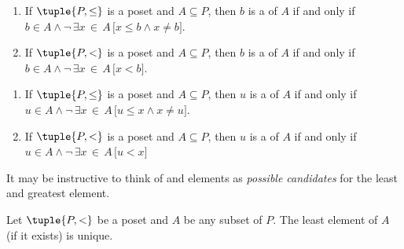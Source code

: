 \begin{dfn}
    \label{dfn:minimal-element}
    \hfill
    \begin{enumerate}[topsep=2pt,label=\texttt{\textup{(\alph*)}},itemsep=5pt]
        \item If \( \tuple{P, \leq} \) is a poset and \( A \subseteq P \), then \( b \) is a  of \( A \)
              if and only if \( b \in A \land \lnot \, \exists x\,{\in}\,A \, \big[ x \leq b \land x \neq b \big] \).
        \item If \( \tuple{P, <} \) is a poset and \( A \subseteq P \), then \( b \) is a  of \( A \)
              if and only if \( b \in A \land \lnot \, \exists x\,{\in}\,A \, \big[ x < b \big] \).
    \end{enumerate}
\end{dfn}

\begin{dfn}
    \label{dfn:maximal-element}
    \hfill
    \begin{enumerate}[topsep=2pt,label=\texttt{\textup{(\alph*)}},itemsep=5pt]
        \item If \( \tuple{P, \leq} \) is a poset and \( A \subseteq P \), then \( u \) is a  of \( A \)
              if and only if \( u \in A \land \lnot \, \exists x\,{\in}\,A \, \big[ u \leq x \land x \neq u \big]\).
        \item If \( \tuple{P, <} \) is a poset and \( A \subseteq P \), then \( u \) is a  of \( A \)
              if and only if \( u \in A \land \lnot \, \exists x\,{\in}\,A \, \big[ u < x \big] \)
    \end{enumerate}
\end{dfn}

\begin{rem}
    It may be instructive to think of  and  elements as \emph{possible candidates} for the least and greatest element.
\end{rem}

\begin{thm}
    \label{thm:uniqueness-of-least-element}
    Let \( \tuple{P, <} \) be a poset and \( A \) be any subset of \( P \). The least element of \( A \) (if it exists) is unique.
\end{thm}

